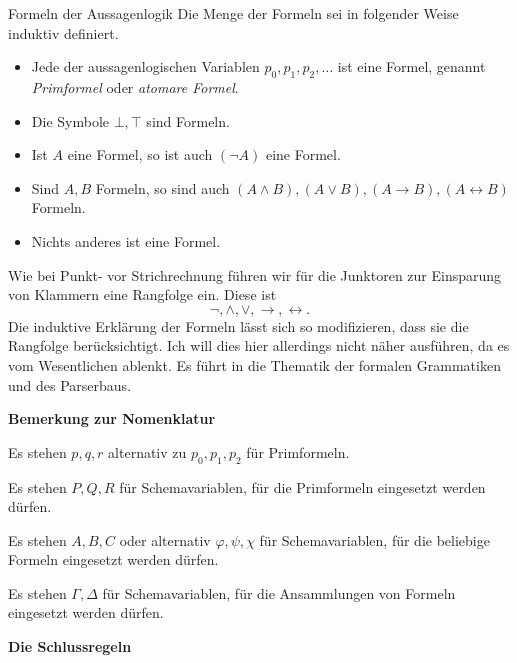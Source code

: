 \documentclass[8pt]{beamer}
\newcommand{\strong}[1]{\textsf{\textbf{#1}}}
\newcommand{\centerheadline}[1]{%
  \begin{center}\strong{#1}\end{center}}
\newcommand{\parspace}{\vspace{0.8em}}
\newcommand{\cond}{\rightarrow}
\newcommand{\bicond}{\leftrightarrow}
\begin{document}
\begin{frame}
\begin{block}{Formeln der Aussagenlogik}
Die Menge der Formeln sei in folgender Weise induktiv definiert.
\begin{itemize}
\item Jede der aussagenlogischen Variablen $p_0,p_1,p_2,\ldots$ ist eine Formel,
genannt \emph{Primformel} oder \emph{atomare Formel}.
\item Die Symbole $\bot, \top$ sind Formeln.
\item Ist $A$ eine Formel, so ist auch $(\lnot A)$ eine Formel.
\item Sind $A,B$ Formeln, so sind auch $(A\land B), (A\lor B), (A\cond B), (A\bicond B)$ Formeln.
\item Nichts anderes ist eine Formel.
\end{itemize}
\end{block}\pause

Wie bei Punkt- vor Strichrechnung führen wir für die Junktoren zur
Einsparung von Klammern eine Rangfolge ein. Diese ist
\[\lnot, \land, \lor, \cond, \bicond.\]
Die induktive Erklärung der Formeln lässt sich so modifizieren, dass
sie die Rangfolge berücksichtigt. Ich will dies hier allerdings nicht
näher ausführen, da es vom Wesentlichen ablenkt. Es führt in die
Thematik der formalen Grammatiken und des Parserbaus.
\end{frame}

\begin{frame}[t]
\vspace{0.5em}
\strong{Bemerkung zur Nomenklatur}

\vspace{4em}
Es stehen $p, q, r$ alternativ zu $p_0, p_1, p_2$ für Primformeln.

\parspace
Es stehen $P, Q, R$ für Schemavariablen, für die Primformeln
eingesetzt werden dürfen.

\parspace
Es stehen $A, B, C$ oder alternativ $\varphi, \psi, \chi$ für
Schemavariablen, für die beliebige Formeln eingesetzt werden dürfen.

\parspace
Es stehen $\Gamma, \Delta$ für Schemavariablen, für die Ansammlungen
von Formeln eingesetzt werden dürfen.
\end{frame}

\begin{frame}
\centerheadline{Die Schlussregeln}
\end{frame}
\end{document}
